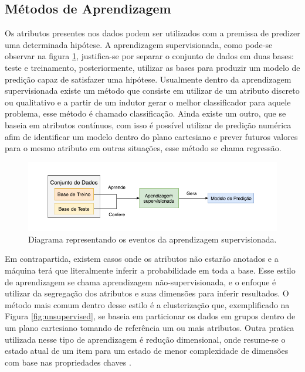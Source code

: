 \subsection{Métodos de Aprendizagem}
Os atributos presentes nos dados podem ser utilizados com a premissa de predizer uma determinada hipótese. A aprendizagem supervisionada, como pode-se observar na figura \ref{fig:supervisedlearning}, justifica-se por separar o conjunto de dados em duas bases: teste e treinamento, posteriormente, utilizar as bases para produzir um modelo de predição capaz de satisfazer uma hipótese. Usualmente dentro da aprendizagem supervisionada existe um método que consiste em utilizar de um atributo discreto ou qualitativo e a partir de um indutor gerar o melhor classificador para aquele problema, esse método é chamado classificação. Ainda existe um outro, que se baseia em atributos contínuos, com isso é possível utilizar de predição numérica afim de identificar um modelo dentro do plano cartesiano e prever futuros valores para o mesmo atributo em outras situações, esse método se chama regressão. \cite{hastie2009unsupervised, russell2003artificial}

\begin{figure}[!h]
    \centering
    \includegraphics[width=.8\textwidth]{imagens/supervisedlearning.png}
    \caption{Diagrama representando os eventos da aprendizagem supervisionada.}
    \label{fig:supervisedlearning}
\end{figure}

Em contrapartida, existem casos onde os atributos não estarão anotados e a máquina terá que literalmente inferir a probabilidade em toda a base. Esse estilo de aprendizagem se chama aprendizagem não-supervisionada, e o enfoque é utilizar da segregação dos atributos e suas dimensões para inferir resultados. O método mais comum dentro desse estilo é a clusterização que, exemplificado na Figura \ref{fig:unsupervised}, se baseia em particionar os dados em grupos dentro de um plano cartesiano tomando de referência um ou mais atributos. Outra pratica utilizada nesse tipo de aprendizagem é redução dimensional, onde resume-se o estado atual de um item para um estado de menor complexidade de dimensões com base nas propriedades chaves \cite{hastie2009unsupervised, mohri2012foundations}.

